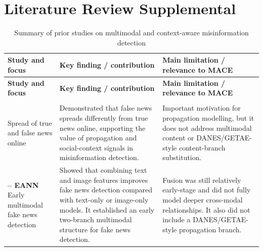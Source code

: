 \section{Literature Review Supplemental}
\label{sec:litreviewsummary}

{\small
\setlength{\tabcolsep}{4pt}
\renewcommand{\arraystretch}{1.15}

\begin{longtable}{
>{\raggedright\arraybackslash}p{}
>{\raggedright\arraybackslash}p{}
>{\raggedright\arraybackslash}p{}
}

\caption{Summary of prior studies on multimodal and context-aware misinformation detection}
\label{tab:lit_summary} \\

\toprule
\textbf{Study and focus} & \textbf{Key finding / contribution} & \textbf{Main limitation / relevance to MACE} \\
\midrule
\endfirsthead

\toprule
\textbf{Study and focus} & \textbf{Key finding / contribution} & \textbf{Main limitation / relevance to MACE} \\
\midrule
\endhead

\midrule
\multicolumn{3}{r}{\emph{Continued on next page}} \\
\endfoot

\bottomrule
\endlastfoot

\textbf{\citet{Vosoughi2018}} \newline
Spread of true and false news online
&
Demonstrated that false news spreads differently from true news online, supporting the value of propagation and social-context signals in misinformation detection.
&
Important motivation for propagation modelling, but it does not address multimodal content or DANES/GETAE-style content-branch substitution. \\

\midrule

\textbf{\citet{Wang2018} -- EANN} \newline
Early multimodal fake news detection
&
Showed that combining text and image features improves fake news detection compared with text-only or image-only models. It established an early two-branch multimodal structure for fake news detection.
&
Fusion was still relatively early-stage and did not fully model deeper cross-modal relationships. It also did not include a DANES/GETAE-style propagation branch. \\


\end{longtable}}
